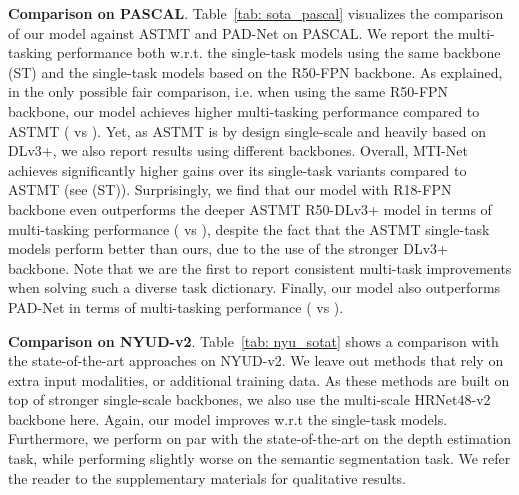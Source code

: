 \documentclass[runningheads]{llncs}
\begin{document}
\noindent\textbf{Comparison on PASCAL}.
Table~\ref{tab: sota_pascal} visualizes the comparison of our model against ASTMT and PAD-Net on PASCAL. We report the multi-tasking performance both w.r.t. the single-task models using the same backbone (ST) and the single-task models based on the R50-FPN backbone. As explained, in the only possible fair comparison, i.e. when using the same R50-FPN backbone, our model achieves higher multi-tasking performance compared to ASTMT ( vs ). Yet, as ASTMT is by design single-scale and heavily based on DLv3+, we also report results using different backbones. Overall, MTI-Net achieves significantly higher gains over its single-task variants compared to ASTMT (see  (ST)). Surprisingly, we find that our model with R18-FPN backbone even outperforms the deeper ASTMT R50-DLv3+ model in terms of multi-tasking performance ( vs ), despite the fact that the ASTMT single-task models perform better than ours, due to the use of the stronger DLv3+ backbone. Note that we are the first to report consistent multi-task improvements when solving such a diverse task dictionary. Finally, our model also outperforms PAD-Net in terms of multi-tasking performance  ( vs ).

\noindent\textbf{Comparison on NYUD-v2}. 
Table~\ref{tab: nyu_sotat} shows a comparison with the state-of-the-art approaches on NYUD-v2. We leave out methods that rely on extra input modalities, or additional training data. As these methods are built on top of stronger single-scale backbones, we also use the multi-scale HRNet48-v2 backbone here. Again, our model improves w.r.t the single-task models. Furthermore, we perform on par with the state-of-the-art on the depth estimation task, while performing slightly worse on the semantic segmentation task. We refer the reader to the supplementary materials for qualitative results.
\end{document}
